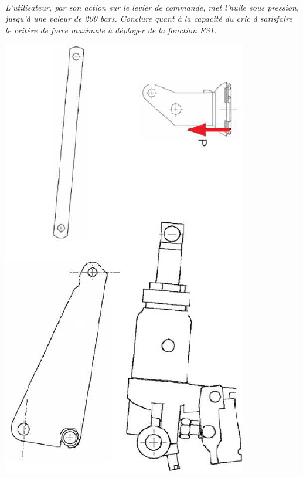 \documentclass[11pt,oneside]{article}
\begin{document}
\paragraph{}
\textit{L'utilisateur, par son action sur le levier de commande, met l'huile sous pression, jusqu'à une valeur de 200 bars. Conclure quant à la capacité du cric à satisfaire le critère de force maximale à déployer de la fonction FS1.}



\begin{center}
\includegraphics[height=.9\textheight]{png/img9.png}
\end{center}
\end{document}
